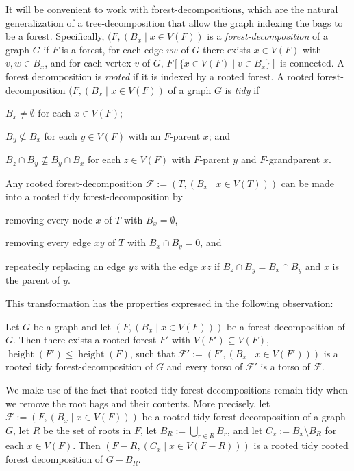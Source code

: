\documentclass{patmorin}
\renewcommand{\le}{\leqslant}
\newcommand{\pat}[1]{\noindent\textcolor{Magenta}{PaMo: #1}}
\newcommand{\piotr}[1]{\noindent\textcolor{red}{PiMi: #1}}
\newcommand{\defin}[1]{\emph{\textcolor{brightmaroon}{#1}}}
\DeclareMathOperator{\height}{height}
\begin{document}
  It will be convenient to work with forest-decompositions, which are the natural generalization of a tree-decomposition that allow the graph indexing the bags to be a forest.  Specifically, $(F,(B_x\mid x\in V(F))$ is a \defin{forest-decomposition} of a graph $G$ if $F$ is a forest, for each edge $vw$ of $G$ there exists $x\in V(F)$ with $v,w\in B_x$, and for each vertex $v$ of $G$, $F[\{x\in V(F)\mid v\in B_x\}]$ is connected.  A forest decomposition is \defin{rooted} if it is indexed by a rooted forest.  A rooted forest-decomposition $(F,(B_x\mid x\in V(F))$ of a graph $G$ is \defin{tidy} if
  \begin{enumerate*}[label=(\arabic*)]
  \item $B_x\neq\emptyset$ for each $x\in V(F)$;
  \item $B_y\not\subseteq B_x$ for each $y\in V(F)$ with an $F$-parent $x$; and
  \item $B_z \cap B_y \not\subseteq B_y\cap B_x$ for each $z\in V(F)$ with $F$-parent $y$ and $F$-grandparent $x$.
  \end{enumerate*}
  Any rooted forest-decomposition $\mathcal{F}:=(T,(B_x\mid x\in V(T)))$ can be made into a rooted tidy forest-decomposition by
  \begin{enumerate*}[label=(\arabic*)]
  \item removing every node $x$ of $T$ with $B_x=\emptyset$,
  \item removing every edge $xy$ of $T$ with $B_x\cap B_y=0$, and
  \item repeatedly replacing an edge $yz$ with the edge $xz$ if $B_z\cap B_y=B_x\cap B_y$ and $x$ is the parent of $y$.
  \end{enumerate*}

    This transformation has the properties expressed in the following observation:
  \begin{obs}\label{tidy_forest}
    Let $G$ be a graph and let $(F,(B_x\mid x\in V(F)))$ be a forest-decomposition of $G$. Then there exists a rooted forest $F'$ with $V(F')\subseteq V(F)$, $\height(F')\le\height(F)$, such that $\mathcal{F}':=(F',(B_x\mid x\in V(F')))$ is a rooted tidy forest-decomposition of $G$ and every torso of $\mathcal{F}'$ is a torso of $\mathcal{F}$.
  \end{obs}
  We make use of the fact that rooted tidy forest decompositions remain tidy when we remove the root bags and their contents.  More precisely, let $\mathcal{F}:=(F,(B_x\mid x\in V(F)))$ be a rooted tidy forest decomposition of a graph $G$, let $R$ be the set of roots in $F$, let $B_R:=\bigcup_{r\in R}B_r$, and let $C_x:=B_x\setminus B_R$ for each $x\in V(F)$.  Then $(F-R,(C_x\mid x\in V(F-R)))$ is a rooted tidy rooted forest decomposition of $G-B_R$.
\end{document}
